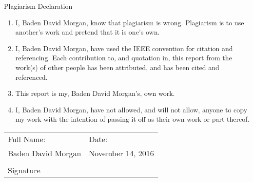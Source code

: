 \documentclass[a4paper,11pt]{article}
\numberwithin{figure}{section}
\numberwithin{table}{section}
\begin{document}
	\thispagestyle{empty}
	{\huge Plagiarism Declaration \par}
	\begin{enumerate}
  		\item I, Baden David Morgan, know that plagiarism is wrong. Plagiarism is to use another’s work and pretend
			that it is one’s own.
 		\item I, Baden David Morgan, have used the IEEE convention for citation and referencing. Each contribution to,
			and quotation in, this report from the work(s) of other people has been attributed,
			and has been cited and referenced.
 		\item This report is my, Baden David Morgan's, own work.
 		\item	I, Baden David Morgan, have not allowed, and will not allow, anyone to copy my work with the intention
			of passing it off as their own work or part thereof.
	\end{enumerate}
		\noindent\begin{tabular}{ll}
		Full Name: & Date:\\%
		Baden David Morgan & November 14, 2016\\[8ex]
		
		\makebox[2.5in]{\hrulefill} \\
		Signature \\[8ex]%
	\end{tabular}
	\newpage
	
	
\end{document}
